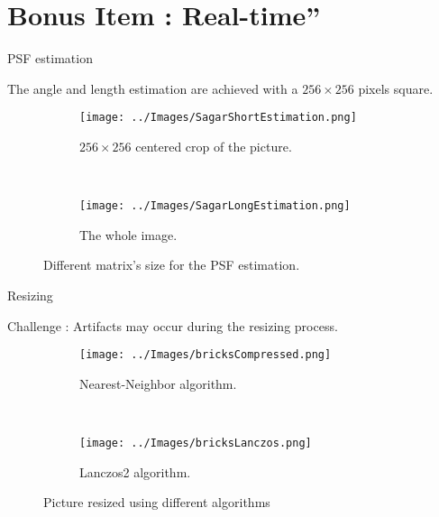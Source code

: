 \section[Bonus Item]{Bonus Item : Real-time''}
\begin{frame}{PSF estimation}

The angle and length estimation are achieved with a $256 \times 256 $ pixels square. 
 
\begin{figure}[h]
\centering
\begin{subfigure}{0.4\textwidth}
\texttt{[image: ../Images/SagarShortEstimation.png]}
\vspace{-20pt}
\caption{ $256\times 256$ centered crop of the picture. }
\label{fig:SagarShort}
\end{subfigure}
~
\begin{subfigure}{0.4\textwidth}
\texttt{[image: ../Images/SagarLongEstimation.png]}
\vspace{-20pt}
\caption{The whole image.}
\label{fig:SagarLong}
\end{subfigure}
\caption{Different matrix's size for the PSF estimation.}
\end{figure}
\end{frame}

\begin{frame}{Resizing}
 
Challenge : Artifacts may occur during the resizing process. 

\begin{figure}
\centering
\begin{subfigure}{0.4\textwidth}
\texttt{[image: ../Images/bricksCompressed.png]}
\vspace{-20pt}
\caption{Nearest-Neighbor algorithm. }
\label{fig:bricksCompressed}
\end{subfigure}
~
\begin{subfigure}{0.4\textwidth}
\texttt{[image: ../Images/bricksLanczos.png]}
\vspace{-20pt}
\caption{Lanczos2 algorithm.}
\label{fig:bricksLanczos}
\end{subfigure}
\caption{Picture resized using different algorithms}
\end{figure}

\end{frame}
